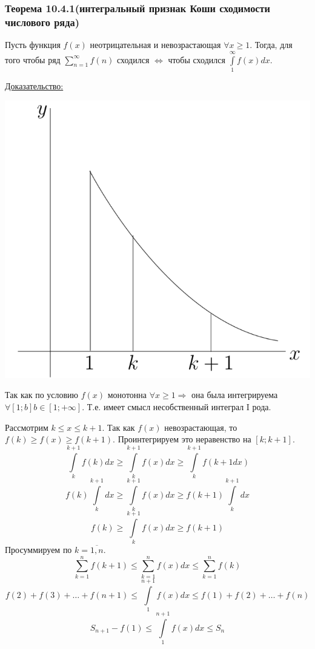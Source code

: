\documentclass[12pt]{article}
\let\ORIincludegraphics\includegraphics
\renewcommand{\includegraphics}[2][]{\ORIincludegraphics[scale=0.65,#1]{#2}}
\let\oldint\int
\let\oldsum\sum
\renewcommand{\int}{\oldint\limits}
\renewcommand{\sum}{\oldsum\limits}
\begin{document}
  \subsubsection*{Теорема 10.4.1(интегральный признак Коши сходимости числового ряда)}\label{th:10.4.1}
  \par\noindent
  Пусть функция $f(x)$ неотрицательная и невозрастающая $\forall x \geq 1$. 
  Тогда, для того чтобы ряд $\sum_{n=1}^{\infty} f(n)$ сходился $\Leftrightarrow$ чтобы сходился 
  $\int^\infty_1 f(x)dx$.

  \underline{Доказательство:}
  \begin{adjustwidth}{1.5em}{1.5em}
    \begin{minipage}{0.45\textwidth}
      \includegraphics[scale=0.45]{10.4.1.png}
    \end{minipage}
    \hspace{1em}
    \begin{minipage}{0.35\textwidth}
      Так как по условию $f(x)$ монотонна $\forall x \geq 1 \Rightarrow$ она была интегрируема $\forall [1;b] b \in [1;+\infty]$.
      Т.е. имеет смысл несобственный интеграл I рода.
    \end{minipage}
    \vspace{1em}
    \par
    Рассмотрим $k \leq x \leq k+1$. Так как $f(x)$ невозрастающая, то 
    $f(k)\geq f(x)\geq f(k+1)$. Проинтегрируем это неравенство на $[k;k+1]$.
    \[\int_{k}^{k+1} f(k)dx \geq \int_{k}^{k+1} f(x)dx \geq \int_{k}^{k+1} f(k+1 dx)\]
    \[f(k) \int_{k}^{k+1} dx \geq \int_{k}^{k+1} f(x)dx \geq f(k+1) \int_{k}^{k+1} dx\]
    \[f(k)\geq \int_{k}^{k+1}f(x)dx \geq f(k+1)\]
    Просуммируем по $k=\overline{1,n}.$
    \[\sum_{k=1}^{n}f(k+1)\leq \sum_{k=1}^{n}f(x)dx \leq \sum_{k=1}^{n}f(k)\]
    \[f(2)+f(3)+\dots+f(n+1)\leq \int_{1}^{n+1} f(x)dx \leq f(1)+f(2)+\dots+f(n)\]
    \[S_{n+1}-f(1)\leq\int_{1}^{n+1}f(x)dx \leq S_n\]
    

\end{adjustwidth}
\end{document}
